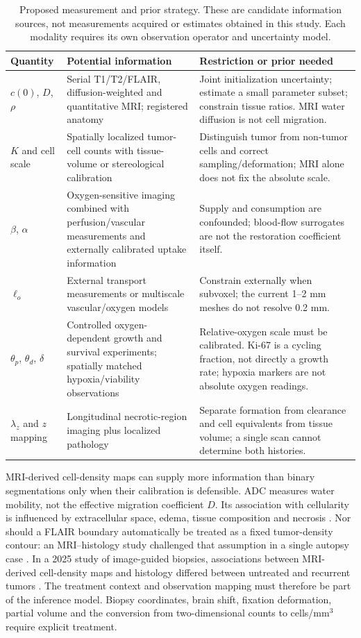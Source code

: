 \begin{table}[p]
\centering\small
\caption{Proposed measurement and prior strategy. These are candidate information sources, not measurements acquired or estimates obtained in this study. Each modality requires its own observation operator and uncertainty model.}\label{tab:measurements}
\begin{tabularx}{\textwidth}{p{}YY}
\toprule Quantity & Potential information & Restriction or prior needed\\\midrule
$c(0)$, $D$, $\rho$ & Serial T1/T2/FLAIR, diffusion-weighted and quantitative MRI; registered anatomy & Joint initialization uncertainty; estimate a small parameter subset; constrain tissue ratios. MRI water diffusion is not cell migration.\\
$K$ and cell scale & Spatially localized tumor-cell counts with tissue-volume or stereological calibration & Distinguish tumor from non-tumor cells and correct sampling/deformation; MRI alone does not fix the absolute scale.\\
$\beta$, $\alpha$ & Oxygen-sensitive imaging combined with perfusion/vascular measurements and externally calibrated uptake information & Supply and consumption are confounded; blood-flow surrogates are not the restoration coefficient itself.\\
$\ell_o$ & External transport measurements or multiscale vascular/oxygen models & Constrain externally when subvoxel; the current 1--2 mm meshes do not resolve 0.2 mm.\\
$\theta_p$, $\theta_d$, $\delta$ & Controlled oxygen-dependent growth and survival experiments; spatially matched hypoxia/viability observations & Relative-oxygen scale must be calibrated. Ki-67 is a cycling fraction, not directly a growth rate; hypoxia markers are not absolute oxygen readings.\\
$\lambda_z$ and $z$ mapping & Longitudinal necrotic-region imaging plus localized pathology & Separate formation from clearance and cell equivalents from tissue volume; a single scan cannot determine both histories.\\\bottomrule
\end{tabularx}
\end{table}

MRI-derived cell-density maps can supply more information than binary segmentations only when their calibration is defensible. ADC measures water mobility, not the effective migration coefficient $D$. Its association with cellularity is influenced by extracellular space, edema, tissue composition and necrosis \citep{eidel2016}. Nor should a FLAIR boundary automatically be treated as a fixed tumor-density contour: an MRI--histology study challenged that assumption in a single autopsy case \citep{martens2021}. In a 2025 study of image-guided biopsies, associations between MRI-derived cell-density maps and histology differed between untreated and recurrent tumors \citep{nocera2025}. The treatment context and observation mapping must therefore be part of the inference model. Biopsy coordinates, brain shift, fixation deformation, partial volume and the conversion from two-dimensional counts to cells/mm$^3$ require explicit treatment.

